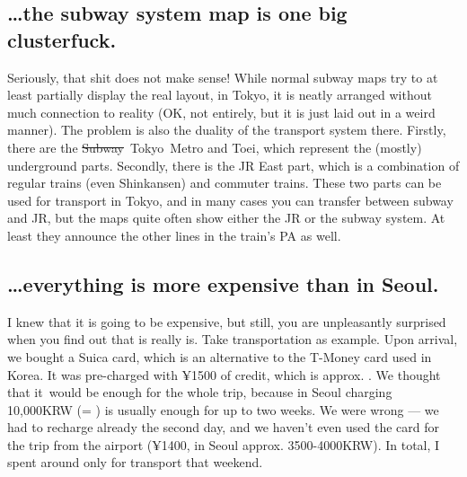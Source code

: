 \begin{post}
\begin{content}
\subsection{{\ldots}the subway system map is one big clusterfuck.}
\begin{figure}
\vspace{-12pt}
\centering{}
\vspace{-24pt}
\end{figure}Seriously, that shit does not make sense! While normal subway maps try to at least partially display the real layout, in Tokyo, it is neatly arranged without much connection to reality (OK, not entirely, but it is just laid out in a weird manner). The problem is also the duality of the transport system there. Firstly, there are the \sout{Subway} Tokyo Metro and Toei, which represent the (mostly) underground parts. Secondly, there is the JR East part, which is a combination of regular trains (even Shinkansen) and commuter trains. These two parts can be used for transport in Tokyo, and in many cases you can transfer between subway and JR, but the maps quite often show either the JR or the subway system. At least they announce the other lines in the train's PA as well.

\subsection{{\ldots}everything is more expensive than in Seoul. }
I knew that it is going to be expensive, but still, you are unpleasantly surprised when you find out that is really is. Take transportation as example. Upon arrival, we bought a Suica card, which is an alternative to the T-Money card used in Korea. It was pre-charged with ¥1500 of credit, which is approx. . We thought that it would be enough for the whole trip, because in Seoul charging 10,000KRW (= ) is usually enough for up to two weeks. We were wrong --- we had to recharge already the second day, and we haven't even used the card for the trip from the airport (¥1400, in Seoul approx. 3500-4000KRW). In total, I spent around  only for transport that weekend.


\end{content}
\end{post}
